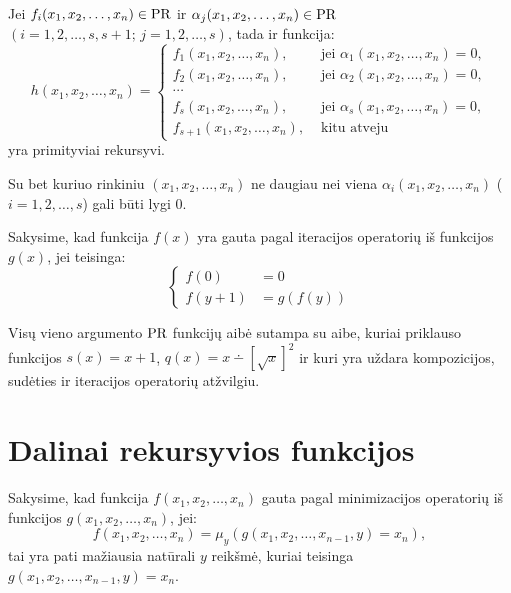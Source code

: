 \begin{prop}
  Jei $f_{i}(x_1,x_2,\dotsc,x_n) \in \mathop{\text{PR}}$ ir 
  $\alpha_{j}(x_1,x_2,\dotsc,x_n) \in \mathop{\text{PR}}$ 
  $(i=1,2,\dotsc,s,s+1;\,j=1,2,\dotsc,s)$, tada ir funkcija:
  \[
  h(x_1,x_2,\dotsc,x_n) =%
  \begin{cases}
    f_{1}(x_1,x_2,\dotsc,x_n), 
      &\text{ jei } \alpha_{1}(x_1,x_2,\dotsc,x_n)=0,\\
    f_{2}(x_1,x_2,\dotsc,x_n), 
      &\text{ jei } \alpha_{2}(x_1,x_2,\dotsc,x_n)=0,\\
    \cdots & {} \\
    f_{s}(x_1,x_2,\dotsc,x_n), 
      &\text{ jei } \alpha_{s}(x_1,x_2,\dotsc,x_n)=0,\\
    f_{s+1}(x_1,x_2,\dotsc,x_n), 
      &\text{ kitu atveju }
  \end{cases}
  \]
  yra primityviai rekursyvi.
  \begin{note}
    Su bet kuriuo rinkiniu $(x_1,x_2,\dotsc,x_n)$ ne daugiau nei viena
    $\alpha_{i}(x_1,x_2,\dotsc,x_n)$ ($i=1,2,\dotsc,s$) gali būti lygi 0.
  \end{note}
\end{prop}

\begin{defn}
  Sakysime, kad funkcija $f(x)$ yra gauta pagal iteracijos operatorių iš
  funkcijos $g(x)$, jei teisinga:
  \[
  \begin{cases}
    f(0) &= 0 \\
    f(y+1) &= g(f(y))
  \end{cases}
  \]
\end{defn}

\begin{prop}
  \label{pr1arg}
  Visų vieno argumento $\mathop{\text{PR}}$ funkcijų aibė sutampa su aibe, kuriai
  priklauso funkcijos $s(x) = x+1$, 
  $q(x) = x \dotminus \left[ \sqrt{x} \right]^2$ ir kuri yra 
  uždara kompozicijos, sudėties ir iteracijos operatorių atžvilgiu.
\end{prop}

\section{Dalinai rekursyvios funkcijos}

\begin{defn}
  Sakysime, kad funkcija $f(x_1,x_2,\dotsc,x_n)$ gauta pagal minimizacijos
  operatorių iš funkcijos $g(x_1,x_2,\dotsc,x_n)$, jei:
  \[
  f(x_1,x_2,\dotsc,x_n) = \mu_{y}(g(x_1,x_2,\dotsc,x_{n-1},y) = x_n),
  \]
  tai yra pati mažiausia natūrali $y$ reikšmė, kuriai teisinga
  $g(x_1,x_2,\dotsc,x_{n-1},y) = x_n$.
\end{defn}

